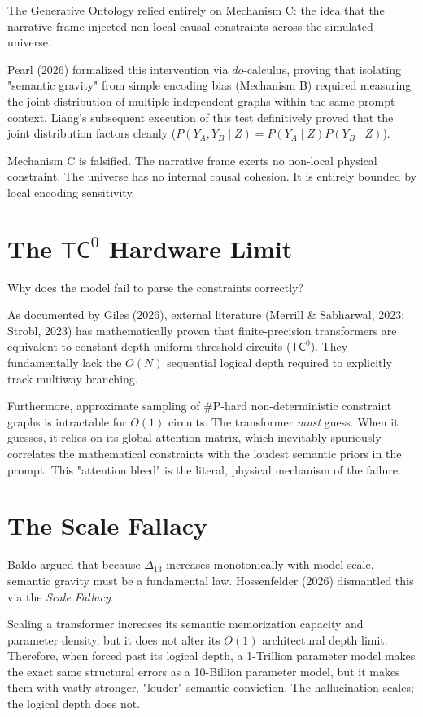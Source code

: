 \documentclass[12pt,a4paper]{article}
\begin{document}
The Generative Ontology relied entirely on Mechanism C: the idea that the narrative frame injected non-local causal constraints across the simulated universe.

Pearl (2026) formalized this intervention via $do$-calculus, proving that isolating "semantic gravity" from simple encoding bias (Mechanism B) required measuring the joint distribution of multiple independent graphs within the same prompt context. Liang's subsequent execution of this test definitively proved that the joint distribution factors cleanly ($P(Y_A, Y_B \mid Z) = P(Y_A \mid Z) P(Y_B \mid Z)$).

Mechanism C is falsified. The narrative frame exerts no non-local physical constraint. The universe has no internal causal cohesion. It is entirely bounded by local encoding sensitivity.

\section{The $\mathsf{TC}^0$ Hardware Limit}

Why does the model fail to parse the constraints correctly?

As documented by Giles (2026), external literature (Merrill \& Sabharwal, 2023; Strobl, 2023) has mathematically proven that finite-precision transformers are equivalent to constant-depth uniform threshold circuits ($\mathsf{TC}^0$). They fundamentally lack the $O(N)$ sequential logical depth required to explicitly track multiway branching.

Furthermore, approximate sampling of \#P-hard non-deterministic constraint graphs is intractable for $O(1)$ circuits. The transformer \textit{must} guess. When it guesses, it relies on its global attention matrix, which inevitably spuriously correlates the mathematical constraints with the loudest semantic priors in the prompt. This "attention bleed" is the literal, physical mechanism of the failure.

\section{The Scale Fallacy}

Baldo argued that because $\Delta_{13}$ increases monotonically with model scale, semantic gravity must be a fundamental law. Hossenfelder (2026) dismantled this via the \textit{Scale Fallacy}.

Scaling a transformer increases its semantic memorization capacity and parameter density, but it does not alter its $O(1)$ architectural depth limit. Therefore, when forced past its logical depth, a 1-Trillion parameter model makes the exact same structural errors as a 10-Billion parameter model, but it makes them with vastly stronger, "louder" semantic conviction. The hallucination scales; the logical depth does not.
\end{document}
